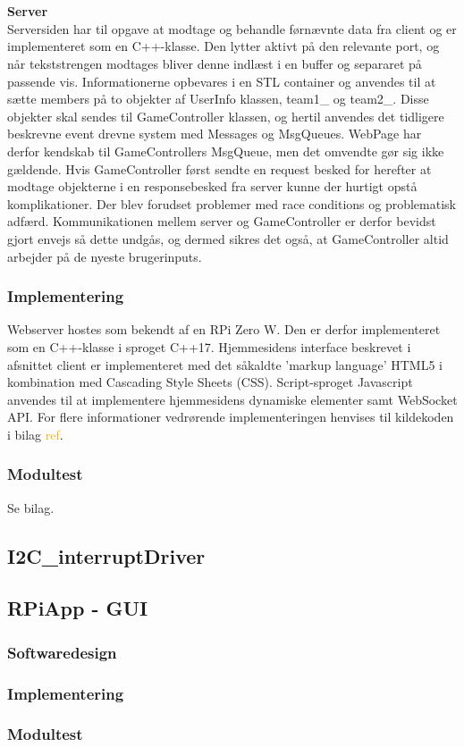 \documentclass[Rapport/Rapport_main.tex]{subfiles}
\begin{document}
\\\\\textbf{Server}
\\Serversiden har til opgave at modtage og behandle førnævnte data fra client og er implementeret som en C++-klasse. Den lytter aktivt på den relevante port, og når tekststrengen modtages bliver denne indlæst i en buffer og separaret på passende vis. Informationerne opbevares i en STL container og anvendes til at sætte members på to objekter af UserInfo klassen, team1\_ og team2\_. Disse objekter skal sendes til GameController klassen, og hertil anvendes det tidligere beskrevne event drevne system med Messages og MsgQueues. WebPage har derfor kendskab til GameControllers MsgQueue, men det omvendte gør sig ikke gældende. Hvis GameController først sendte en request besked for herefter at modtage objekterne i en responsebesked fra server kunne der hurtigt opstå komplikationer. Der blev forudset problemer med race conditions og problematisk adfærd. Kommunikationen mellem server og GameController er derfor bevidst gjort envejs så dette undgås, og dermed sikres det også, at GameController altid arbejder på de nyeste brugerinputs.

\subsubsection{Implementering}
Webserver hostes som bekendt af en RPi Zero W. Den er derfor implementeret som en C++-klasse i sproget C++17. Hjemmesidens interface beskrevet i afsnittet client er implementeret med det såkaldte 'markup language' HTML5 i kombination med Cascading Style Sheets (CSS). Script-sproget Javascript anvendes til at implementere hjemmesidens dynamiske elementer samt WebSocket API. For flere informationer vedrørende implementeringen henvises til kildekoden i bilag \textcolor{orange}{ref}.

\subsubsection{Modultest}
Se bilag.

\subsection{I2C\_interruptDriver}




\subsection{RPiApp - GUI}

\subsubsection{Softwaredesign}
\subsubsection{Implementering}
\subsubsection{Modultest}
\end{document}
